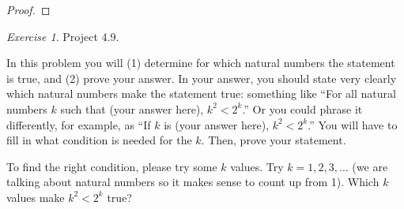 \documentclass[12pt,oneside]{amsart}
\theoremstyle{remark}
\newtheorem{exer}{Exercise}
\newcommand{\bfZ}{\mathbf{Z}}
\begin{document}
\begin{proof}
%
%

\end{proof}

%
%
%
%

\newpage
\begin{exer}
Project 4.9.

In this problem you will (1) determine for which natural numbers the statement is true, and (2) prove your answer. In your answer, you should state very clearly which natural numbers make the statement true: something like “For all natural numbers $k$ such that (your answer here), $k^2 < 2^k$.” Or you could phrase it differently, for example, as “If $k$ is (your answer here), $k^2 < 2^k$.” You will have to fill in what condition is needed for the $k$. Then, prove your statement.

To find the right condition, please try some $k$ values. Try  $k = 1, 2, 3, ...$ (we are talking about natural numbers so it makes sense to count up from 1). Which $k$ values make
$k^2 < 2^k$ true?
\end{exer}
\end{document}
